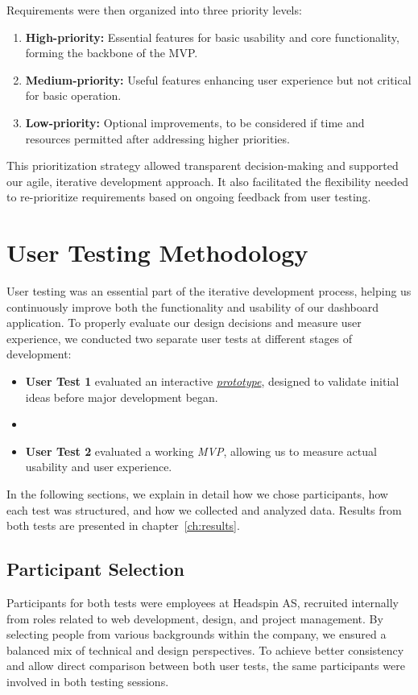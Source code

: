 Requirements were then organized into three priority levels:

\begin{enumerate}
    \item \textbf{High-priority:} Essential features for basic usability and core functionality, forming the backbone of the MVP.
    \item \textbf{Medium-priority:} Useful features enhancing user experience but not critical for basic operation.
    \item \textbf{Low-priority:} Optional improvements, to be considered if time and resources permitted after addressing higher priorities.
\end{enumerate}

This prioritization strategy allowed transparent decision-making and supported our agile, iterative development approach. It also facilitated the flexibility needed to re-prioritize requirements based on ongoing feedback from user testing.

\section{User Testing Methodology}
\label{sec:user_testing}
User testing was an essential part of the iterative development process, helping us continuously improve both the functionality and usability of our dashboard application. To properly evaluate our design decisions and measure user experience, we conducted two separate user tests at different stages of development:

\begin{itemize}
    \item \textbf{User Test 1} evaluated an interactive \textit{\hyperref[fig:prototype_dashboard]{prototype}}, designed to validate initial ideas before major development began.
    \item[] 
    \item \textbf{User Test 2} evaluated a working \textit{\acrshort{MVP}}, allowing us to measure actual usability and user experience. 
\end{itemize}

In the following sections, we explain in detail how we chose participants, how each test was structured, and how we collected and analyzed data. Results from both tests are presented in chapter~\ref{ch:results}.

\subsection{Participant Selection}
\label{subsec:participant_selection}
Participants for both tests were employees at Headspin AS, recruited internally from roles related to web development, design, and project management. By selecting people from various backgrounds within the company, we ensured a balanced mix of technical and design perspectives. To achieve better consistency and allow direct comparison between both user tests, the same participants were involved in both testing sessions.

